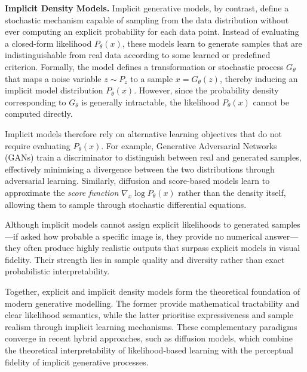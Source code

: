 \noindent\textbf{Implicit Density Models.}
Implicit generative models, by contrast, define a stochastic mechanism capable of sampling from the data distribution without ever computing an explicit probability for each data point. Instead of evaluating a closed-form likelihood \(P_\theta(x)\), these models learn to generate samples that are indistinguishable from real data according to some learned or predefined criterion.  
Formally, the model defines a transformation or stochastic process \(G_\theta\) that maps a noise variable \(z \sim P_z\) to a sample \(x = G_\theta(z)\), thereby inducing an implicit model distribution \(P_\theta(x)\). However, since the probability density corresponding to \(G_\theta\) is generally intractable, the likelihood \(P_\theta(x)\) cannot be computed directly.

Implicit models therefore rely on alternative learning objectives that do not require evaluating \(P_\theta(x)\). For example, Generative Adversarial Networks (GANs) train a discriminator to distinguish between real and generated samples, effectively minimising a divergence between the two distributions through adversarial learning. Similarly, diffusion and score-based models learn to approximate the \emph{score function} \(\nabla_x \log P_\theta(x)\) rather than the density itself, allowing them to sample through stochastic differential equations.  

Although implicit models cannot assign explicit likelihoods to generated samples—if asked how probable a specific image is, they provide no numerical answer—they often produce highly realistic outputs that surpass explicit models in visual fidelity. Their strength lies in sample quality and diversity rather than exact probabilistic interpretability.  

Together, explicit and implicit density models form the theoretical foundation of modern generative modelling. The former provide mathematical tractability and clear likelihood semantics, while the latter prioritise expressiveness and sample realism through implicit learning mechanisms. These complementary paradigms converge in recent hybrid approaches, such as diffusion models, which combine the theoretical interpretability of likelihood-based learning with the perceptual fidelity of implicit generative processes.